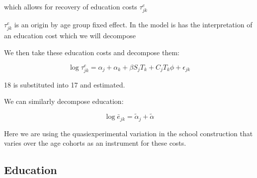 \documentclass[12pt]{article}
\begin{document}
which allows for recovery of education costs $\tau_{jk}^e$

$\tau_{jk}^e$ is an origin by age group fixed effect. In the model is has the interpretation of an education cost which we will decompose

We then take these education costs and decompose them:

\begin{equation}
    \log \tau_{jk}^e = \alpha_j +\alpha_k +\beta S_j T_k + C_jT_k\phi +\epsilon_{jk}
\end{equation}

18 is substituted into 17 and estimated.






We can similarly decompose education:

\begin{equation}
    \log \bar e_{jk} = \tilde \alpha_j + \tilde\alpha
\end{equation}



Here we are using the quasiexperimental variation in the school construction that varies over the age cohorts as an instrument for these costs.






\subsection{Education}
\end{document}
